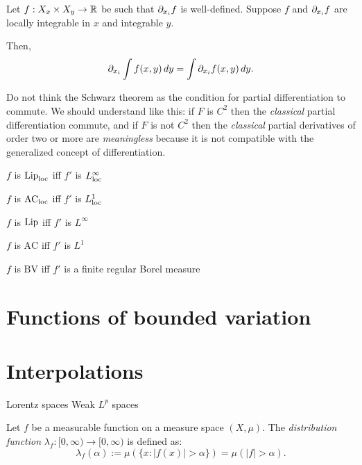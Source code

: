 \documentclass{../../large}
\begin{document}
\begin{prb}
Let $f:X_x\times X_y\to\mathbb{R}$ be such that $\pd_{x_i}f$ is well-defined. Suppose $f$ and $\pd_{x_i}f$ are locally integrable in $x$ and integrable $y$.

Then,
\[\pd_{x_i}\int f(x,y)\,dy=\int\pd_{x_i}f(x,y)\,dy.\]
\end{prb}


Do not think the Schwarz theorem as the condition for partial differentiation to commute.
We should understand like this: if $F$ is $C^2$ then the \emph{classical} partial differentiation commute, and if $F$ is not $C^2$ then the \emph{classical} partial derivatives of order two or more are \emph{meaningless} because it is not compatible with the generalized concept of differentiation.




\begin{parts}
\item $f$ is $\operatorname{Lip}_{\mathrm{loc}}$ iff $f'$ is $L_{\mathrm{loc}}^\infty$
\item $f$ is $\textrm{AC}_{\mathrm{loc}}$ iff $f'$ is $L_{\mathrm{loc}}^1$
\end{parts}
\begin{parts}
\item $f$ is $\operatorname{Lip}$ iff $f'$ is $L^\infty$
\item $f$ is $\textrm{AC}$ iff $f'$ is $L^1$
\item $f$ is $\textrm{BV}$ iff $f'$ is a finite regular Borel measure
\end{parts}

\begin{prb}
\end{prb}

\begin{prb}
\end{prb}



\section{Functions of bounded variation}


\section{Interpolations}
Lorentz spaces
Weak $L^p$ spaces

\begin{defn}
Let $f$ be a measurable function on a measure space $(X,\mu)$.
The \emph{distribution function} $\lambda_f:[0,\infty)\to [0,\infty)$ is defined as:
\[\lambda_f(\alpha):=\mu(\{x:|f(x)|>\alpha\})=\mu(|f|>\alpha).\]
\end{defn}
\end{document}
